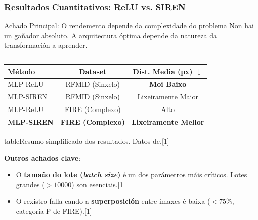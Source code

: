 \documentclass[xcolor=dvipsnames]{beamer}
\begin{document}
\begin{frame}
    \frametitle{Resultados Cuantitativos: ReLU vs. SIREN}
    
    \begin{block}{Achado Principal: O rendemento depende da complexidade do problema}
        Non hai un gañador absoluto. A arquitectura óptima depende da natureza da transformación a aprender.
    \end{block}
    
    \begin{columns}
        \begin{column}{0.5\textwidth}
            \centering
            \begin{tabular}{lcc}
                \toprule
                \textbf{Método} & \textbf{Dataset} & \textbf{Dist. Media (px) $\downarrow$} \\
                \midrule
                MLP-ReLU & RFMID (Sinxelo) & \textbf{Moi Baixo} \\
                MLP-SIREN & RFMID (Sinxelo) & Lixeiramente Maior \\
                \midrule
                MLP-ReLU & FIRE (Complexo) & Alto \\
                \rowcolor{ficblue!20}
                \textbf{MLP-SIREN} & \textbf{FIRE (Complexo)} & \textbf{Lixeiramente Mellor} \\
                \bottomrule
            \end{tabular}
            \small{table}{Resumo simplificado dos resultados. Datos de.[1]}
            
            \vspace{0.5cm}
            \textbf{Outros achados clave}:
            \begin{itemize}
                \item O \textbf{tamaño do lote (\textit{batch size})} é un dos parámetros máis críticos. Lotes grandes ($>10000$) son esenciais.[1]
                \item O rexistro falla cando a \textbf{superposición} entre imaxes é baixa ($<75\%$, categoría P de FIRE).[1]
            \end{itemize}
        \end{column}
        

\end{columns}
\end{frame}
\end{document}
